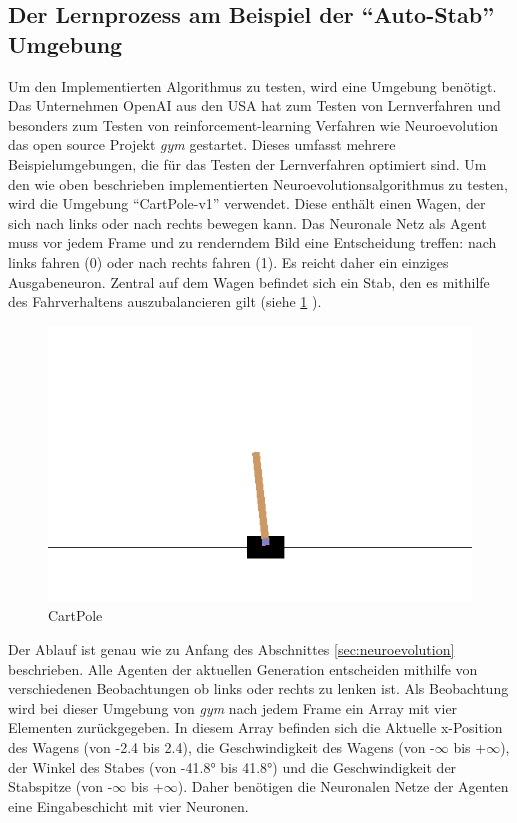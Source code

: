 \documentclass[parskip=half,titlepage]{scrartcl}
\begin{document}
\subsection{Der Lernprozess am Beispiel der ``Auto-Stab'' Umgebung}
\label{sec:test}
Um den Implementierten Algorithmus zu testen, wird eine Umgebung benötigt. Das Unternehmen OpenAI aus den USA hat zum Testen von Lernverfahren und besonders zum Testen von reinforcement-learning Verfahren wie Neuroevolution das open source Projekt \textit{gym} gestartet. Dieses umfasst mehrere Beispielumgebungen, die für das Testen der Lernverfahren optimiert sind. Um den wie oben beschrieben implementierten Neuroevolutionsalgorithmus zu testen, wird die Umgebung ``CartPole-v1'' verwendet. Diese enthält einen Wagen, der sich nach links oder nach rechts bewegen kann. Das Neuronale Netz als Agent muss vor jedem Frame und zu renderndem Bild eine Entscheidung treffen: nach links fahren (0) oder nach rechts fahren (1). Es reicht daher ein einziges Ausgabeneuron. Zentral auf dem Wagen befindet sich ein Stab, den es mithilfe des Fahrverhaltens auszubalancieren gilt (siehe \cref{fig:cartpole} ). 

\begin{figure}
 \centering
 \includegraphics[scale = 0.5]{Abbildungen/cartpole.png}
 \caption{CartPole}
 \label{fig:cartpole}
\end{figure}

Der Ablauf ist genau wie zu Anfang des Abschnittes \cref{sec:neuroevolution} beschrieben. Alle Agenten der aktuellen Generation entscheiden mithilfe von verschiedenen Beobachtungen ob links oder rechts zu lenken ist. Als Beobachtung wird bei dieser Umgebung von \textit{gym} nach jedem Frame ein Array mit vier Elementen zurückgegeben. In diesem Array befinden sich die Aktuelle x-Position des Wagens (von -2.4 bis 2.4), die Geschwindigkeit des Wagens (von -$\infty$ bis +$\infty$), der Winkel des Stabes (von -41.8° bis 41.8°) und die Geschwindigkeit der Stabspitze (von -$\infty$ bis +$\infty$). Daher benötigen die Neuronalen Netze der Agenten eine Eingabeschicht mit vier Neuronen. 
\end{document}
